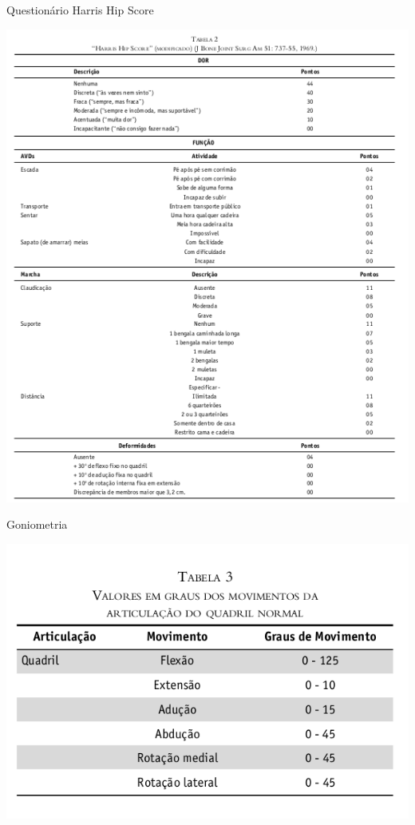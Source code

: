 \documentclass{beamer}
\begin{document}
\begin{frame}{Questionário Harris Hip Score}
  \begin{center}
    \includegraphics[height=.9\textheight]{figuras/tabela2}
  \end{center}
\end{frame}

\begin{frame}{Goniometria}
  \begin{center}
    \includegraphics[height=.9\textheight]{figuras/tabela3}
  \end{center}
\end{frame}
\end{document}
